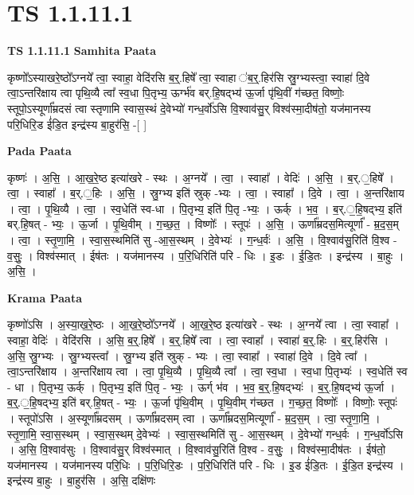 \documentclass[17pt]{extarticle}
\begin{document}
\section*{ TS 1.1.11.1 }

\textbf{TS 1.1.11.1 } \newline
\textbf{Samhita Paata} \newline

कृष्णो᳚ऽस्याखरे॒ष्ठो᳚ऽग्नये᳚ त्वा॒ स्वाहा॒ वेदि॑रसि ब॒र्॒.हिषे᳚ त्वा॒ स्वाहा ॑ब॒र्॒.हिर॑सि स्रु॒ग्भ्यस्त्वा॒ स्वाहा॑ दि॒वे त्वा॒ऽन्तरि॑क्षाय त्वा पृथि॒व्यै त्वा᳚ स्व॒धा पि॒तृभ्य॒ ऊर्ग्भ॑व बर्.हि॒षद्भ्य॑  ऊ॒र्जा पृ॑थि॒वीं ग॑च्छत॒ विष्णोः॒ स्तूपो॒ऽस्यूर्णा᳚म्रदसं त्वा स्तृणामि स्वास॒स्थं दे॒वेभ्यो॑ गन्ध॒र्वो॑ऽसि वि॒श्वाव॑सु॒र् विश्व॑स्मा॒दीष॑तो॒ यज॑मानस्य परि॒धिरि॒ड ई॑डि॒त इन्द्र॑स्य बा॒हुर॑सि॒ -[ ] \newline

\textbf{Pada Paata} \newline

कृष्णः॑ । अ॒सि॒ । आ॒ख॒रे॒ष्ठ इत्या॑खरे - स्थः । अ॒ग्नये᳚ । त्वा॒ । स्वाहा᳚ । वेदिः॑ । अ॒सि॒ । ब॒र्.॒हिषे᳚ । त्वा॒ । स्वाहा᳚ । ब॒र्.॒हिः । अ॒सि॒ । स्रु॒ग्भ्य इति॑ स्रुक् -भ्यः । त्वा॒ । स्वाहा᳚ । दि॒वे । त्वा॒ । अ॒न्तरि॑क्षाय । त्वा॒ । पृ॒थि॒व्यै । त्वा॒ । स्व॒धेति॑ स्व-धा । पि॒तृभ्य॒ इति॑ पि॒तृ -भ्यः॒ । ऊर्क् । भ॒व॒ । ब॒र्.॒हि॒षद्भ्य॒ इति॑ बर्.हि॒षत् - भ्यः॒ । ऊ॒र्जा । पृ॒थि॒वीम् । ग॒च्छ॒त॒ । विष्णोः᳚ । स्तूपः॑ । अ॒सि॒ । ऊर्णा᳚म्रदस॒मित्यूर्णा᳚ - म्र॒द॒स॒म् । त्वा॒ । स्तृ॒णा॒मि॒ । स्वा॒स॒स्थमिति॑ सु -आ॒स॒स्थम् । दे॒वेभ्यः॑ । ग॒न्ध॒र्वः॑ । अ॒सि॒ । वि॒श्वाव॑सु॒रिति॑ वि॒श्व - व॒सुः॒ । विश्व॑स्मात् । ईष॑तः । यज॑मानस्य । प॒रि॒धिरिति॑ परि - धिः । इ॒डः । ई॒डि॒तः । इन्द्र॑स्य । बा॒हुः । अ॒सि॒ ।  \newline


\textbf{Krama Paata} \newline

कृष्णो॑ऽसि । अ॒स्या॒ख॒रे॒ष्ठः । आ॒ख॒रे॒ष्ठो᳚ऽग्नये᳚ । आ॒ख॒रे॒ष्ठ इत्या॑खरे - स्थः । अ॒ग्नये᳚ त्वा । त्वा॒ स्वाहा᳚ । स्वाहा॒ वेदिः॑ । वेदि॑रसि । अ॒सि॒ ब॒र्॒.हिषे᳚ । ब॒र्॒.हिषे᳚ त्वा । त्वा॒ स्वाहा᳚ । स्वाहा॑ ब॒र्॒.हिः । ब॒र्॒.हिर॑सि । अ॒सि॒ स्रु॒ग्भ्यः । स्रु॒ग्भ्यस्त्वा᳚ । स्रु॒ग्भ्य इति॑ स्रुक् - भ्यः । त्वा॒ स्वाहा᳚ । स्वाहा॑ दि॒वे । दि॒वे त्वा᳚ । त्वा॒ऽन्तरि॑क्षाय । अ॒न्तरि॑क्षाय त्वा । त्वा॒ पृ॒थि॒व्यै । पृ॒थि॒व्यै त्वा᳚ । त्वा॒ स्व॒धा । स्व॒धा पि॒तृभ्यः॑ । स्व॒धेति॑ स्व - धा । पि॒तृभ्य॒ ऊर्क् । पि॒तृभ्य॒ इति॑ पि॒तृ - भ्यः॒ । ऊर्ग् भ॑व । भ॒व॒ ब॒॒र्॒.हि॒षद्भ्यः॑ । ब॒॒र्॒.हि॒षद्भ्य॑ ऊ॒र्जा । ब॒र्॒.॒हि॒षद्भ्य॒ इति॑ बर्.हि॒षत् - भ्यः॒ । ऊ॒र्जा पृ॑थि॒वीम् । पृ॒थि॒वीम् ग॑च्छत । ग॒च्छ॒त॒ विष्णोः᳚ । विष्णोः॒ स्तूपः॑ । स्तूपो॑ऽसि । अ॒स्यूर्णा᳚म्रदसम् । 
ऊर्णा᳚म्रदसम् त्वा । ऊर्णा᳚म्रदस॒मित्यूर्णा᳚ - म्र॒द॒स॒म् । त्वा॒ स्तृ॒णा॒मि॒ । स्तृ॒णा॒मि॒ स्वा॒स॒स्थम् । स्वा॒स॒स्थम् दे॒वेभ्यः॑ । स्वा॒स॒स्थमिति॑ सु - आ॒स॒स्थम् । दे॒वेभ्यो॑ गन्ध॒र्वः । ग॒न्ध॒र्वो॑ऽसि । अ॒सि॒ वि॒श्वाव॑सुः । वि॒श्वाव॑सु॒र् विश्व॑स्मात् । वि॒श्वाव॑सु॒रिति॑ वि॒श्व - व॒सुः॒ । विश्व॑स्मा॒दीष॑तः । ईष॑तो॒ यज॑मानस्य । यज॑मानस्य परि॒धिः । प॒रि॒धिरि॒डः । प॒रि॒धिरिति॑ परि - धिः । इ॒ड ई॑डि॒तः । ई॒डि॒त इन्द्र॑स्य । इन्द्र॑स्य बा॒हुः । बा॒हुर॑सि । अ॒सि॒ दक्षि॑णः \newline
\end{document}
